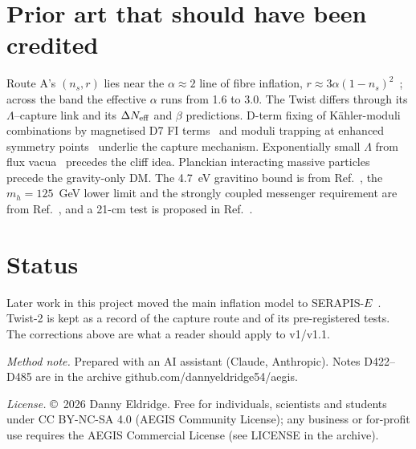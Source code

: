 \documentclass[aps,prd,twocolumn,superscriptaddress,nofootinbib,showkeys]{revtex4-2}
\begin{document}
\section{Prior art that should have been credited}
Route A's $(n_s,r)$ lies near the $\alpha\approx2$ line of fibre inflation, $r\approx3\alpha(1-n_s)^2$~\cite{fibre}; across the band the effective $\alpha$ runs from 1.6 to 3.0. The Twist differs through its $\Lambda$--capture link and its $\Delta N_{\rm eff}$ and $\beta$ predictions. D-term fixing of K\"ahler-moduli combinations by magnetised D7 FI terms~\cite{dterm} and moduli trapping at enhanced symmetry points~\cite{trap} underlie the capture mechanism. Exponentially small $\Lambda$ from flux vacua~\cite{smallL} precedes the cliff idea. Planckian interacting massive particles~\cite{PIDM} precede the gravity-only DM. The 4.7~eV gravitino bound is from Ref.~\cite{grav}, the $m_h=125$~GeV lower limit and the strongly coupled messenger requirement are from Ref.~\cite{msg}, and a 21-cm test is proposed in Ref.~\cite{21}.

\section{Status}
Later work in this project moved the main inflation model to SERAPIS-$E$~\cite{SE}. Twist-2 is kept as a record of the capture route and of its pre-registered tests. The corrections above are what a reader should apply to v1/v1.1.

\emph{Method note.} Prepared with an AI assistant (Claude, Anthropic). Notes D422--D485 are in the archive github.com/dannyeldridge54/aegis.

\emph{License.} \copyright~2026 Danny Eldridge. Free for individuals, scientists and students under CC BY-NC-SA 4.0 (AEGIS Community License); any business or for-profit use requires the AEGIS Commercial License (see LICENSE in the archive).
\end{document}
